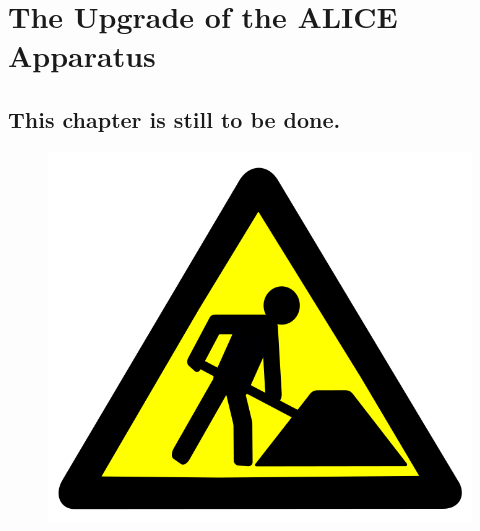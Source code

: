 \chapter{The Upgrade of the ALICE Apparatus}
\section{This chapter is still to be done.}
%
\begin{figure}
  \centering
  \includegraphics[scale=0.30]{figures/work-in-progress.png}
\end{figure}
%
\lipsum